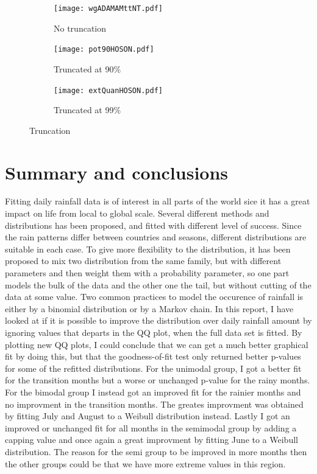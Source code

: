 \documentclass{article}
\begin{document}
	
	\begin{figure}[H]
		\centering
		\begin{subfigure}{0.33\textwidth}
			\texttt{[image: wgADAMAMttNT.pdf]}
			\caption{No truncation}
		\end{subfigure}%
		\begin{subfigure}{0.33\textwidth}
			\texttt{[image: pot90HOSON.pdf]}
			\caption{Truncated at 90\%}
		\end{subfigure}%
		\begin{subfigure}{0.33\textwidth}
			\texttt{[image: extQuanHOSON.pdf]}
			\caption{Truncated at 99\%}
		\end{subfigure}
	\caption{Truncation}
	\end{figure}
	

	\section{Summary and conclusions}
	Fitting daily rainfall data is of interest in all parts of the world sice it has a great impact on life from local to global scale. Several different methods and distributions has been proposed, and fitted with different level of success. Since the rain patterns differ between countries and seasons, different distributions are suitable in each case. To give more flexibility to the distribution, it has been proposed to mix two distribution from the same family, but with different parameters and then weight them with a probability parameter, so one part models the bulk of the data and the other one the tail, but without cutting of the data at some value. Two common practices to model the occurence of rainfall is either by a binomial distribution or by a Markov chain. In this report, I have looked at if it is possible to improve the distribution over daily rainfall amount by ignoring values that departs in the QQ plot, when the full data set is fitted. By plotting new QQ plots, I could conclude that we can get a much better graphical fit by doing this, but that the goodness-of-fit test only returned better p-values for some of the refitted distributions. For the unimodal group, I got a better fit for the transition months but a worse or unchanged p-value for the rainy months. For the bimodal group I instead got an improved fit for the rainier months and no improvment in the transition months. The greates improvment was obtained by fitting July and August to a Weibull distribution instead. Lastly I got an improved or unchanged fit for all months in the semimodal group by adding a capping value and once again a great improvment by fitting June to a Weibull distribution. The reason for the semi group to be improved in more months then the other groups could be that we have more extreme values in this region. 
\end{document}

